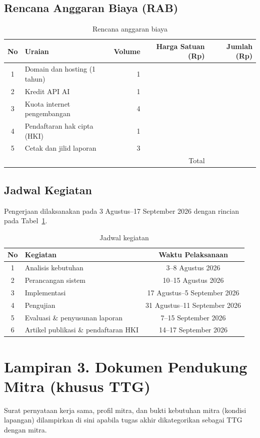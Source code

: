 \subsection*{Rencana Anggaran Biaya (RAB)}
\begin{table}[htbp]
  \centering
  \caption{Rencana anggaran biaya}
  \small
  \begin{tabular}{@{}clrrr@{}}
    \toprule
    No & Uraian & Volume & Harga Satuan (Rp) & Jumlah (Rp) \\
    \midrule
    1 & Domain dan hosting (1 tahun)   & 1 &  &  \\
    2 & Kredit API AI                  & 1 &  &  \\
    3 & Kuota internet pengembangan    & 4 &  &  \\
    4 & Pendaftaran hak cipta (HKI)    & 1 &  &  \\
    5 & Cetak dan jilid laporan        & 3 &  &  \\
    \midrule
    \multicolumn{4}{r}{Total} &  \\
    \bottomrule
  \end{tabular}
\end{table}

\subsection*{Jadwal Kegiatan}
Pengerjaan dilaksanakan pada 3 Agustus--17 September 2026 dengan rincian
pada Tabel~\ref{tab:jadwal}.

\begin{table}[htbp]
  \centering
  \caption{Jadwal kegiatan}
  \label{tab:jadwal}
  \small
  \begin{tabular}{@{}clc@{}}
    \toprule
    No & Kegiatan & Waktu Pelaksanaan \\
    \midrule
    1 & Analisis kebutuhan                   & 3--8 Agustus 2026              \\
    2 & Perancangan sistem                   & 10--15 Agustus 2026            \\
    3 & Implementasi                         & 17 Agustus--5 September 2026   \\
    4 & Pengujian                            & 31 Agustus--11 September 2026  \\
    5 & Evaluasi \& penyusunan laporan       & 7--15 September 2026           \\
    6 & Artikel publikasi \& pendaftaran HKI & 14--17 September 2026          \\
    \bottomrule
  \end{tabular}
\end{table}

\clearpage
\section*{Lampiran 3. Dokumen Pendukung Mitra (khusus TTG)}
Surat pernyataan kerja sama, profil mitra, dan bukti kebutuhan mitra
(kondisi lapangan) dilampirkan di sini apabila tugas akhir dikategorikan
sebagai TTG dengan mitra.
